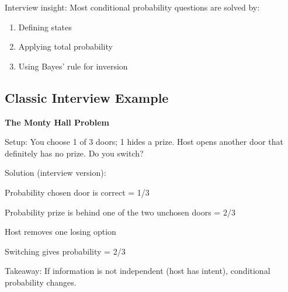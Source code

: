 \documentclass{report}
\begin{document}
Interview insight:
Most conditional probability questions are solved by:

\begin{enumerate}
    \item Defining states
    \item Applying total probability
    \item Using Bayes' rule for inversion
\end{enumerate}


\subsection*{Classic Interview Example}

\textbf{The Monty Hall Problem}
\ex{}
{
Setup:
You choose 1 of 3 doors; 1 hides a prize.
Host opens another door that definitely has no prize.
Do you switch?

Solution (interview version):

Probability chosen door is correct = 1/3

Probability prize is behind one of the two unchosen doors = 2/3

Host removes one losing option

Switching gives probability = 2/3

Takeaway:
If information is not independent (host has intent), conditional probability changes.

\vspace{1em}

}
\vspace{1em}
\end{document}
